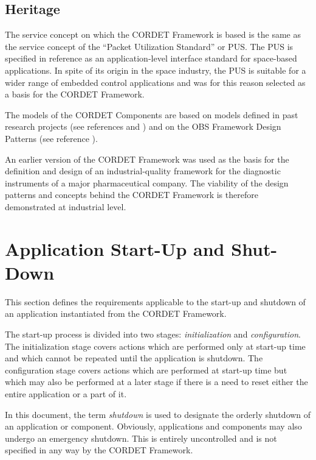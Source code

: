 \documentclass[a4paper,10pt]{article}
\let\stdsection\section
\renewcommand\section{\newpage\stdsection}
\begin{document}
\subsection{Heritage}\label{sec:Heritage}
The service concept on which the CORDET Framework is based is the same as the service concept of the “Packet Utilization Standard” or PUS. 
The PUS is specified in reference \cite{ref:pus} as an application-level interface standard for space-based applications. 
In spite of its origin in the space industry, the PUS is suitable for a wider range of embedded control applications and was for this reason selected as a basis for the CORDET Framework. 

The models of the CORDET Components are based on models defined in past research projects (see references \cite{ref:assert} and \cite{ref:cordet}) and on the OBS Framework Design Patterns (see reference \cite{ref:obs}). 

An earlier version of the CORDET Framework was used as the basis for the definition and design of an industrial-quality framework for the diagnostic instruments of a major pharmaceutical company. The viability of the design patterns and concepts behind the CORDET Framework is therefore demonstrated at industrial level. 

\section{Application Start-Up and Shut-Down}\label{sec:AppStartUpAndShutdown}

This section defines the requirements applicable to the start-up and shutdown of an application instantiated from the CORDET Framework.

The start-up process is divided into two stages: \textit{initialization} and \textit{configuration}. The initialization stage covers actions which are performed only at start-up time and which cannot be repeated until the application is shutdown. The configuration stage covers actions which are performed at start-up time but which may also be performed at a later stage if there is a need to reset either the entire application or a part of it. 

In this document, the term \textit{shutdown} is used to designate the orderly shutdown of an application or component. Obviously, applications and components may also undergo an emergency shutdown. This is entirely uncontrolled and is not specified in any way by the CORDET Framework.
\end{document}
